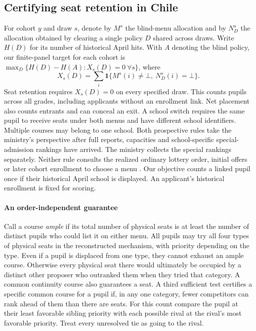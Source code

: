 \subsection{Certifying seat retention in Chile}\label{sec:retain-evidence}
For cohort $y$ and draw $s$, denote by $M^s$ the blind-menu allocation and by $N_D^s$ the allocation obtained by clearing a single policy $D$ shared across draws. Write $H(D)$ for its number of historical April hits. With $A$ denoting the blind policy, our finite-panel target for each cohort is $\max_D\{H(D)-H(A): X_s(D)=0\ \forall s\}$, where
\[
 X_s(D)=\sum_i \mathbf 1\{M^s(i)\ne\bot,\ N_D^s(i)=\bot\}.
\]
Seat retention requires $X_s(D)=0$ on every specified draw. This counts pupils across all grades, including applicants without an enrollment link. Net placement also counts entrants and can conceal an exit. A school switch requires the same pupil to receive seats under both menus and have different school identifiers. Multiple courses may belong to one school. Both prospective rules take the ministry's perspective after full reports, capacities and school-specific special-admission rankings have arrived. The ministry collects the special rankings separately. Neither rule consults the realized ordinary lottery order, initial offers or later cohort enrollment to choose a menu \citep{saeprioritytiming}. Our objective counts a linked pupil once if their historical April school is displayed. An applicant's historical enrollment is fixed for scoring.

\paragraph{An order-independent guarantee}
Call a course \emph{ample} if its total number of physical seats is at least the number of distinct pupils who could list it on either menu. All pupils may try all four types of physical seats in the reconstructed mechanism, with priority depending on the type. Even if a pupil is displaced from one type, they cannot exhaust an ample course. Otherwise every physical seat there would ultimately be occupied by a distinct other proposer who outranked them when they tried that category. A common continuity course also guarantees a seat. A third sufficient test certifies a specific common course for a pupil if, in any one category, fewer competitors can rank ahead of them than there are seats. For this count compare the pupil at their least favorable sibling priority with each possible rival at the rival's most favorable priority. Treat every unresolved tie as going to the rival.

